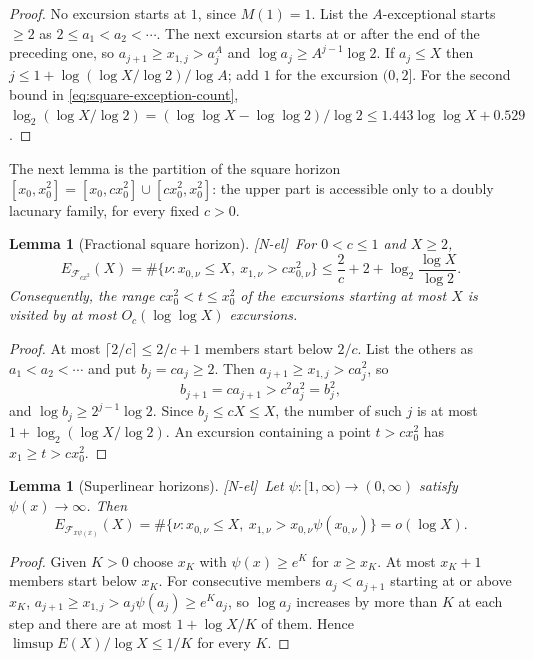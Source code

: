 \documentclass[11pt]{amsart}
\numberwithin{equation}{section}
\theoremstyle{plain}
\newtheorem{lemma}[theorem]{Lemma}
\theoremstyle{definition}
\theoremstyle{remark}
\newcommand{\F}{\mathcal{F}}
\newcommand{\tagNE}{\textup{[N-el]}}
\begin{document}
\begin{proof}
No excursion starts at $1$, since $M(1)=1$. List the $A$-exceptional starts
$\ge2$ as $2\le a_1<a_2<\cdots$. The next excursion starts at or after the
end of the preceding one, so $a_{j+1}\ge x_{1,j}>a_j^A$ and
$\log a_j\ge A^{j-1}\log2$. If $a_j\le X$ then
$j\le1+\log(\log X/\log2)/\log A$; add $1$ for the excursion $(0,2]$. For the
second bound in \eqref{eq:square-exception-count},
$\log_2(\log X/\log2)=(\log\log X-\log\log2)/\log2\le1.443\log\log X+0.529$.
\end{proof}

The next lemma is the partition of the square horizon
$[x_0,x_0^2]=[x_0,cx_0^2]\cup[cx_0^2,x_0^2]$: the upper part is accessible
only to a doubly lacunary family, for every fixed $c>0$.

\begin{lemma}[Fractional square horizon]
\label{lem:partition}
\tagNE\ For $0<c\le1$ and $X\ge2$,
\begin{equation}
\label{eq:partition-count}
E_{\F_{cx^2}}(X)=\#\{\nu:x_{0,\nu}\le X,\ x_{1,\nu}>cx_{0,\nu}^2\}
\le\frac2c+2+\log_2\frac{\log X}{\log2}.
\end{equation}
Consequently, the range $cx_0^2<t\le x_0^2$ of the excursions starting at
most $X$ is visited by at most $O_c(\log\log X)$ excursions.
\end{lemma}

\begin{proof}
At most $\lceil2/c\rceil\le2/c+1$ members start below $2/c$. List the others
as $a_1<a_2<\cdots$ and put $b_j=ca_j\ge2$. Then
$a_{j+1}\ge x_{1,j}>ca_j^2$, so
\[
b_{j+1}=ca_{j+1}>c^2a_j^2=b_j^2,
\]
and $\log b_j\ge2^{j-1}\log2$. Since $b_j\le cX\le X$, the number of such
$j$ is at most $1+\log_2(\log X/\log2)$. An excursion containing a point
$t>cx_0^2$ has $x_1\ge t>cx_0^2$.
\end{proof}

\begin{lemma}[Superlinear horizons]
\label{lem:superlinear}
\tagNE\ Let $\psi:[1,\infty)\to(0,\infty)$ satisfy $\psi(x)\to\infty$. Then
\[
E_{\F_{x\psi(x)}}(X)
=\#\{\nu:x_{0,\nu}\le X,\ x_{1,\nu}>x_{0,\nu}\psi(x_{0,\nu})\}
=o(\log X).
\]
\end{lemma}

\begin{proof}
Given $K>0$ choose $x_K$ with $\psi(x)\ge e^K$ for $x\ge x_K$. At most
$x_K+1$ members start below $x_K$. For consecutive members
$a_j<a_{j+1}$ starting at or above $x_K$,
$a_{j+1}\ge x_{1,j}>a_j\psi(a_j)\ge e^Ka_j$, so $\log a_j$ increases by more
than $K$ at each step and there are at most $1+\log X/K$ of them. Hence
$\limsup E(X)/\log X\le1/K$ for every $K$.
\end{proof}
\end{document}

